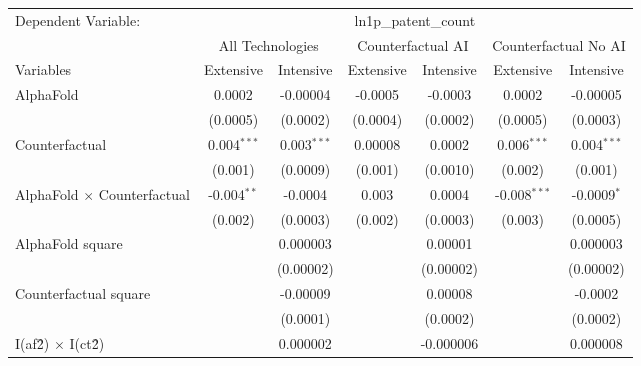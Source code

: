 \begingroup
\centering
\begin{tabular}{lcccccc}
   \tabularnewline \midrule \midrule
   Dependent Variable: & \multicolumn{6}{c}{ln1p\_patent\_count}\\
 & \multicolumn{2}{c}{All Technologies} & \multicolumn{2}{c}{Counterfactual AI} & \multicolumn{2}{c}{Counterfactual No AI} \\
\cmidrule(lr){1-1}\cmidrule(lr){2-3} \cmidrule(lr){4-5} \cmidrule(lr){6-7}
Variables & \multicolumn{1}{c}{Extensive} & \multicolumn{1}{c}{Intensive} & \multicolumn{1}{c}{Extensive} & \multicolumn{1}{c}{Intensive} & \multicolumn{1}{c}{Extensive} & \multicolumn{1}{c}{Intensive} \\
\cmidrule(lr){1-1}\cmidrule(lr){2-2} \cmidrule(lr){3-3} \cmidrule(lr){4-4} \cmidrule(lr){5-5} \cmidrule(lr){6-6} \cmidrule(lr){7-7}
   AlphaFold                          & 0.0002        & -0.00004      & -0.0005  & -0.0003    & 0.0002         & -0.00005\\   
                                      & (0.0005)      & (0.0002)      & (0.0004) & (0.0002)   & (0.0005)       & (0.0003)\\   
   Counterfactual                     & 0.004$^{***}$ & 0.003$^{***}$ & 0.00008  & 0.0002     & 0.006$^{***}$  & 0.004$^{***}$\\   
                                      & (0.001)       & (0.0009)      & (0.001)  & (0.0010)   & (0.002)        & (0.001)\\   
   AlphaFold $\times$ Counterfactual  & -0.004$^{**}$ & -0.0004       & 0.003    & 0.0004     & -0.008$^{***}$ & -0.0009$^{*}$\\   
                                      & (0.002)       & (0.0003)      & (0.002)  & (0.0003)   & (0.003)        & (0.0005)\\   
   AlphaFold square                   &               & 0.000003      &          & 0.00001    &                & 0.000003\\   
                                      &               & (0.00002)     &          & (0.00002)  &                & (0.00002)\\   
   Counterfactual square              &               & -0.00009      &          & 0.00008    &                & -0.0002\\   
                                      &               & (0.0001)      &          & (0.0002)   &                & (0.0002)\\   
   I(af\^2) $\times$ I(ct\^2)         &               & 0.000002      &          & -0.000006  &                & 0.000008\\   

\end{tabular}
